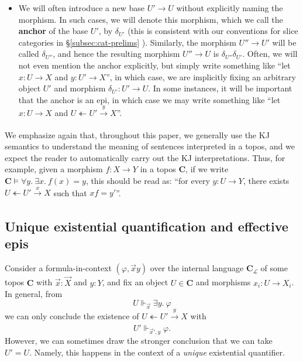\documentclass{amsart}
\newcommand\bC{\mathbf{C}}
\newcommand\cL{\mathcal{L}}
\newcommand\defword[1]{{\boldmath \textbf{#1}}}
\newcommand\oot{\twoheadleftarrow}
\renewcommand\phi{\varphi}
\newcommand\tox[2][]{\xrightarrow[#1]{#2}}
\newcommand\vek[1]{{\vec{#1}}}
\newcommand\vx{\vek{x}}
\newcommand\vX{\vek{X}}
\newcommand\prerefpost[3]{%
  \texorpdfstring%
    {\hyperref[#2]{#1\ref*{#2}#3}}%
    {#1\ref*{#2}#3}%
}
\newcommand\sref[1]{\prerefpost{\S}{#1}{}}
\theoremstyle{definition}
\theoremstyle{remark}
\theoremstyle{plainwithref}
\begin{document}
\begin{rmk}
\begin{itemize}
    Similarly, given \( \delta_{U_0} \colon U_0 \to U \) or \( \delta_{U_1} \colon U_1 \to U \), we will write \( x_0 = \delta_{U_0} x \colon U_0 \to X \) and \( x_1 = \delta_{U_1} x \colon U_1 \to X \).

    If, as often happens, we have a morphism \( y \colon U' \to X \) and then we further introduce \( \delta_{U''} \colon U'' \to U' \), note that we write \( y'' \), and not \( y' \), for the morphism \( \delta_{U''} y \colon U'' \to X \).
  \item We will often introduce a new base \( U' \to U \) without explicitly naming the morphism.
    In such cases, we will denote this morphism, which we call the \defword{anchor} of the base \( U' \), by \( \delta_{U'} \) (this is consistent with our conventions for slice categories in \sref{subsec:cat-prelims}).
    Similarly, the morphism \( U'' \to U' \) will be called \( \delta_{U''} \), and hence the resulting morphism \( U'' \to U \) is \( \delta_{U''} \delta_{U'} \).
    Often, we will not even mention the anchor explicitly, but simply write something like ``let \( x \colon U \to X \) and \( y \colon U' \to X \)'', in which case, we are implicitly fixing an arbitrary object \( U' \) and morphism \( \delta_{U'} \colon U' \to U \).
    In some instances, it will be important that the anchor is an epi, in which case we may write something like ``let \( x \colon U \to X \) and \( U \oot U' \tox{y} X \)''.
  \end{itemize}
\end{rmk}

We emphasize again that, throughout this paper, we generally use the KJ semantics to understand the meaning of sentences interpreted in a topos, and we expect the reader to automatically carry out the KJ interpretations.
Thus, for example, given a morphism \( f \colon X \to Y \) in a topos \( \bC \), if we write \( \bC \vDash \forall y.\ \exists x.\ f(x) = y \), this should be read as: ``for every \( y \colon U \to Y \), there exists \( U \oot U' \tox{x} X \) such that \( x f = y' \)''.

\subsection{Unique existential quantification and effective epis} \label{subsec:uniq-ex-eff-epi}
Consider a formula-in-context \( (\phi, \vx y) \) over the internal language \( \bC_\cL \) of some topos \( \bC \) with \( \vx \colon \vX \) and \( y \colon Y \), and fix an object \( U \in \bC \) and morphisms \( x_i \colon U \to X_i \).
In general, from
\[
  U \Vdash_{\vx} \exists y.\ \phi
\]
we can only conclude the existence of \( U \oot U' \tox{y} X \) with
\[
  U' \Vdash_{\vx',y} \phi.
\]
However, we can sometimes draw the stronger conclusion that we can take \( U' = U \).
Namely, this happens in the context of a \emph{unique} existential quantifier.
\end{document}
